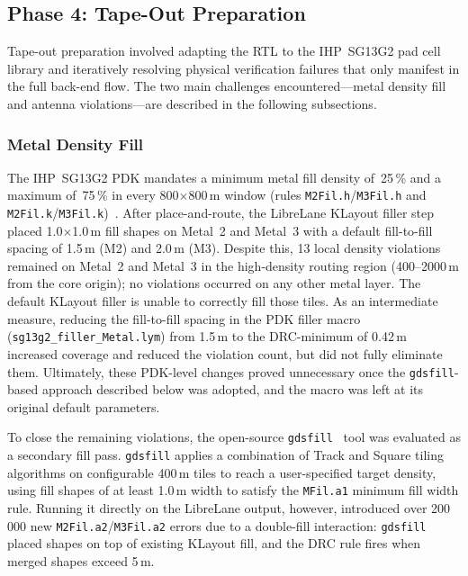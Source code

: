 \documentclass[manuscript,screen,nonacm]{acmart}
\begin{document}
\subsection{Phase 4: Tape-Out Preparation}
\label{sec:process:phase4}

Tape-out preparation involved adapting the RTL to the IHP~SG13G2 pad
cell library and iteratively resolving physical
verification failures that only manifest in the full back-end flow.
The two main challenges encountered—metal density fill and antenna
violations—are described in the following subsections.

\subsubsection{Metal Density Fill}
\label{sec:process:phase4:fill}

The IHP~SG13G2 PDK mandates a minimum metal fill density of~25\,\%
and a maximum of~75\,\% in every 800$\times$800\,\textmu{}m window
(rules \texttt{M2Fil.h}/\texttt{M3Fil.h} and \texttt{M2Fil.k}/\texttt{M3Fil.k})~\cite{ihpsg13g2}.
After place-and-route, the LibreLane KLayout filler step~\cite{librelane}
placed 1.0$\times$1.0\,\textmu{}m fill shapes on Metal~2 and Metal~3
with a default fill-to-fill spacing of 1.5\,\textmu{}m (M2) and 2.0\,\textmu{}m (M3).
Despite this, 13 local density violations remained on Metal~2 and Metal~3
in the high-density routing region (400--2000\,\textmu{}m from the core origin);
no violations occurred on any other metal layer.
The default KLayout filler is unable to correctly fill those tiles.
As an intermediate measure, reducing the fill-to-fill spacing in the PDK
filler macro (\texttt{sg13g2\_filler\_Metal.lym}) from 1.5\,\textmu{}m to
the DRC-minimum of 0.42\,\textmu{}m increased coverage and reduced the
violation count, but did not fully eliminate them.
Ultimately, these PDK-level changes proved unnecessary once the
\texttt{gdsfill}-based approach described below was adopted, and the
macro was left at its original default parameters.

To close the remaining violations, the open-source
\texttt{gdsfill}~\cite{gdsfill} tool was evaluated as a secondary fill pass.
\texttt{gdsfill} applies a combination of Track and Square tiling algorithms
on configurable 400\,\textmu{}m tiles to reach a user-specified target density,
using fill shapes of at least 1.0\,\textmu{}m width to satisfy the
\texttt{MFil.a1} minimum fill width rule.
Running it directly on the LibreLane output, however, introduced
over 200\,000 new \texttt{M2Fil.a2}/\texttt{M3Fil.a2} errors due to a
double-fill interaction: \texttt{gdsfill} placed shapes on top of
existing KLayout fill, and the DRC rule fires when merged shapes exceed
5\,\textmu{}m.
\end{document}
